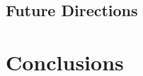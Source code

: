 \documentclass[english]{article}
\begin{document}



\subsection{Future Directions}






\section{Conclusions} \label{section_conclusion}




\end{document}
